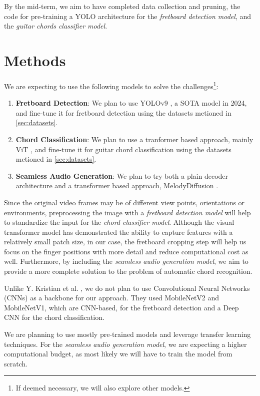 \documentclass[10pt,twocolumn,letterpaper]{article}
\begin{document}
By the mid-term, we aim to have completed data collection and pruning, the code for pre-training a YOLO architecture for the \emph{fretboard detection model}, and the \emph{guitar chords classifier model}.

\section{Methods}\label{sec:methods}

We are expecting to use the following models to solve the challenges\footnote{If deemed necessary, we will also explore other models.}:
\begin{enumerate}[label=\arabic*), itemsep=0.25pt]
    \item \textbf{Fretboard Detection}: We plan to use YOLOv9 \cite{wang2024yolov9}, a SOTA model in 2024, and fine-tune it for fretboard detection using the datasets metioned in \cref{sec:datasets}.
    \item \textbf{Chord Classification}: We plan to use a tranformer based approach, mainly ViT \cite{dosovitskiy2020image}, and fine-tune it for guitar chord classification using the datasets metioned in \cref{sec:datasets}.
    \item \textbf{Seamless Audio Generation}: We plan to try both a plain decoder architecture and a transformer based approach, MelodyDiffusion \cite{math11081915}.
\end{enumerate}

Since the original video frames may be of different view points, orientations or environments, preprocessing the image with a \emph{fretboard detection model} will help to standardize the input for the \emph{chord classifier model}. Although the visual transformer model has demonstrated the ability to capture features with a relatively small patch size, in our case, the fretboard cropping step will help us focus on the finger positions with more detail and reduce computational cost as well.
Furthermore, by including the \emph{seamless audio generation model}, we aim to provide a more complete solution to the problem of automatic chord recognition.

Unlike Y. Kristian et al. \cite{Kristian_Zaman_Tenoyo_Jodhinata_2024}, we do not plan to use Convolutional Neural Networks (CNNs) as a backbone for our approach. They used MobileNetV2 and MobileNetV1, which are CNN-based, for the fretboard detection and a Deep CNN for the chord classification. 

We are planning to use mostly pre-trained models and leverage transfer learning techniques. For the \emph{seamless audio generation model}, we are expecting a higher computational budget, as most likely we will have to train the model from scratch.
\end{document}
